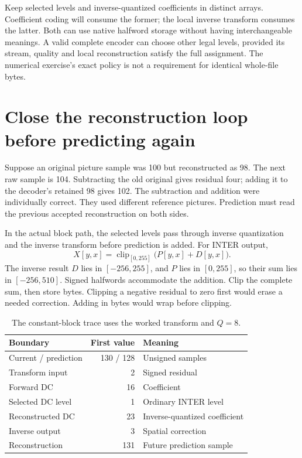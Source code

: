 Keep selected levels and inverse-quantized coefficients in distinct arrays.
Coefficient coding will consume the former; the local inverse transform consumes
the latter. Both can use native halfword storage without having interchangeable
meanings. A valid complete encoder can choose other legal levels, provided its
stream, quality and local reconstruction satisfy the full assignment. The numerical
exercise's exact policy is not a requirement for identical whole-file bytes.

\section{Close the reconstruction loop before predicting again}

Suppose an original picture sample was 100 but reconstructed as 98. The next raw
sample is 104. Subtracting the old original gives residual four; adding it to the
decoder's retained 98 gives 102. The subtraction and addition were individually
correct. They used different reference pictures. Prediction must read the previous
accepted reconstruction on both sides.



In the actual block path, the selected levels pass through inverse quantization
and the inverse transform before prediction is added. For INTER output,
\[
  X[y,x]=\operatorname{clip}_{[0,255]}\big(P[y,x]+D[y,x]\big).
\]
The inverse result $D$ lies in $[-256,255]$, and $P$ lies in $[0,255]$, so their
sum lies in $[-256,510]$. Signed halfwords accommodate the addition. Clip the
complete sum, then store bytes. Clipping a negative residual to zero first would
erase a needed correction. Adding in bytes would wrap before clipping.

\begin{table}[!ht]
  \centering
  \begin{tabular}{l r l}
    \toprule
    Boundary             & First value & Meaning                       \\
    \midrule
    Current / prediction & 130 / 128   & Unsigned samples              \\
    Transform input      & 2           & Signed residual               \\
    Forward DC           & 16          & Coefficient                   \\
    Selected DC level    & 1           & Ordinary INTER level          \\
    Reconstructed DC     & 23          & Inverse-quantized coefficient \\
    Inverse output       & 3           & Spatial correction            \\
    Reconstruction       & 131         & Future prediction sample      \\
    \bottomrule
  \end{tabular}
  \caption{The constant-block trace uses the worked transform and $Q=8$.}
\end{table}

